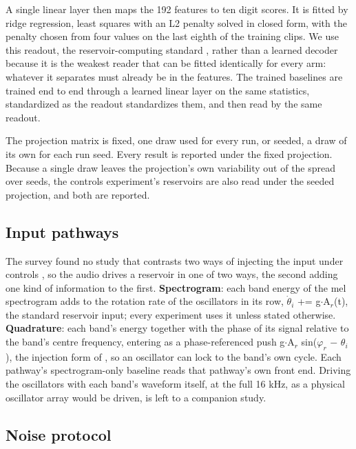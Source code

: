 \documentclass[10pt]{article}
\begin{document}
A single linear layer then maps the 192 features to ten digit scores. It
is fitted by ridge regression, least squares with an L2 penalty solved
in closed form, with the penalty chosen from four values on the last
eighth of the training clips. We use this readout, the
reservoir-computing standard \citep{jaeger2001, lukosevicius2012},
rather than a learned decoder because it is the weakest reader that can
be fitted identically for every arm: whatever it separates must already
be in the features. The trained baselines are trained end to end through
a learned linear layer on the same statistics, standardized as the
readout standardizes them, and then read by the same readout.

The projection matrix is fixed, one draw used for every run, or seeded,
a draw of its own for each run seed. Every result is reported under the
fixed projection. Because a single draw leaves the projection's own
variability out of the spread over seeds, the controls experiment's
reservoirs are also read under the seeded projection, and both are
reported.

\subsection{Input pathways}\label{input-pathways}

The survey found no study that contrasts two ways of injecting the input
under controls \citep{kryski2026}, so the audio drives a reservoir in
one of two ways, the second adding one kind of information to the first.
\textbf{Spectrogram}: each band energy of the mel spectrogram adds to
the rotation rate of the oscillators in its row,
\ensuremath{\dot{\theta}_{i}} +=
g\ensuremath{\cdot}A\ensuremath{_{r}}(t), the standard reservoir input;
every experiment uses it unless stated otherwise. \textbf{Quadrature}:
each band's energy together with the phase of its signal relative to the
band's centre frequency, entering as a phase-referenced push
g\ensuremath{\cdot}A\ensuremath{_{r}} sin(\ensuremath{\varphi_{r}}
\ensuremath{-} \ensuremath{\theta_{i}}), the injection form of
\citet{adler1946}, so an oscillator can lock to the band's own cycle.
Each pathway's spectrogram-only baseline reads that pathway's own front
end. Driving the oscillators with each band's waveform itself, at the
full 16 kHz, as a physical oscillator array would be driven, is left to
a companion study.

\subsection{Noise protocol}\label{noise-protocol}
\end{document}
